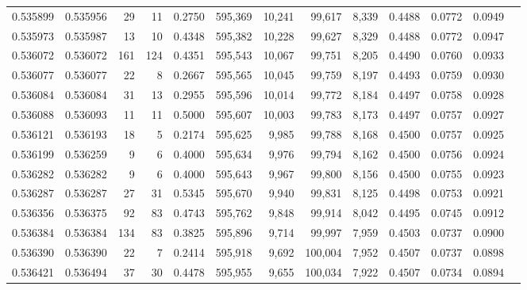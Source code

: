 \begin{tabular}{rrrrrrrrrrrrr}
0.535899 & 0.535956 &    29 &    11 &                                     0.2750 & 595,369 &  10,241 &  99,617 &   8,339 & 0.4488 & 0.0772 & 0.0949 \\
0.535973 & 0.535987 &    13 &    10 &                                     0.4348 & 595,382 &  10,228 &  99,627 &   8,329 & 0.4488 & 0.0772 & 0.0947 \\
0.536072 & 0.536072 &   161 &   124 &                                     0.4351 & 595,543 &  10,067 &  99,751 &   8,205 & 0.4490 & 0.0760 & 0.0933 \\
0.536077 & 0.536077 &    22 &     8 &                                     0.2667 & 595,565 &  10,045 &  99,759 &   8,197 & 0.4493 & 0.0759 & 0.0930 \\
0.536084 & 0.536084 &    31 &    13 &                                     0.2955 & 595,596 &  10,014 &  99,772 &   8,184 & 0.4497 & 0.0758 & 0.0928 \\
0.536088 & 0.536093 &    11 &    11 &                                     0.5000 & 595,607 &  10,003 &  99,783 &   8,173 & 0.4497 & 0.0757 & 0.0927 \\
0.536121 & 0.536193 &    18 &     5 &                                     0.2174 & 595,625 &   9,985 &  99,788 &   8,168 & 0.4500 & 0.0757 & 0.0925 \\
0.536199 & 0.536259 &     9 &     6 &                                     0.4000 & 595,634 &   9,976 &  99,794 &   8,162 & 0.4500 & 0.0756 & 0.0924 \\
0.536282 & 0.536282 &     9 &     6 &                                     0.4000 & 595,643 &   9,967 &  99,800 &   8,156 & 0.4500 & 0.0755 & 0.0923 \\
0.536287 & 0.536287 &    27 &    31 &                                     0.5345 & 595,670 &   9,940 &  99,831 &   8,125 & 0.4498 & 0.0753 & 0.0921 \\
0.536356 & 0.536375 &    92 &    83 &                                     0.4743 & 595,762 &   9,848 &  99,914 &   8,042 & 0.4495 & 0.0745 & 0.0912 \\
0.536384 & 0.536384 &   134 &    83 &                                     0.3825 & 595,896 &   9,714 &  99,997 &   7,959 & 0.4503 & 0.0737 & 0.0900 \\
0.536390 & 0.536390 &    22 &     7 &                                     0.2414 & 595,918 &   9,692 & 100,004 &   7,952 & 0.4507 & 0.0737 & 0.0898 \\
0.536421 & 0.536494 &    37 &    30 &                                     0.4478 & 595,955 &   9,655 & 100,034 &   7,922 & 0.4507 & 0.0734 & 0.0894 \\

\end{tabular}
